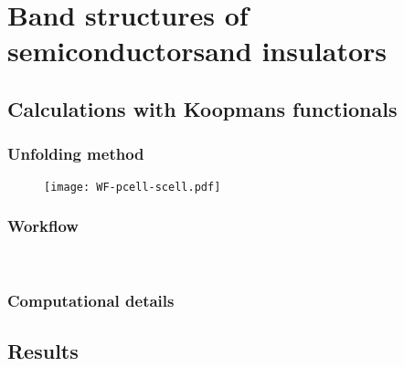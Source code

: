 \cleardoublepage
\chapter[Band structures of semiconductors and insulators]{Band structures of semiconductors\break and insulators\label{ch:band-structures}}

\section{Calculations with Koopmans functionals\label{sec:calculations-koopmans}}

\subsection{Unfolding method\label{sec:unfolding-method}}

\begin{figure}
    \centering
    \texttt{[image: WF-pcell-scell.pdf]}
    \caption[]{}
    \label{fig:map-wf}
\end{figure}


\subsection{Workflow\label{sec:workflow}}

\begin{figure}
    \centering
     \\
    \caption[]{}
    \label{fig:workflow}
\end{figure}

\subsection{Computational details\label{sec:computational-details}}

\section{Results\label{sec:results-bands}}

